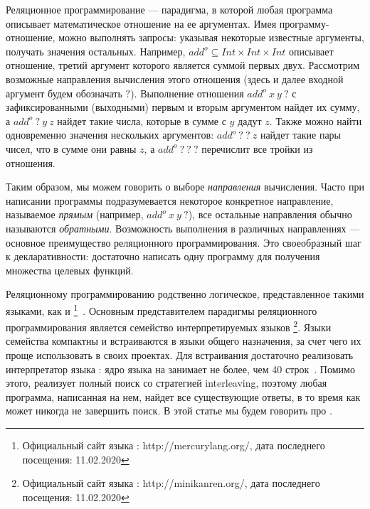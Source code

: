 \documentclass[conference,american,russian]{IEEEtran}
\begin{document}
Реляционное программирование --- парадигма, в которой любая программа описывает математическое отношение на ее аргументах. 
Имея программу-отношение, можно выполнять запросы: указывая некоторые известные аргументы, получать значения остальных.
Например, $add^o \subseteq Int \times Int \times Int$ описывает отношение, третий аргумент которого является суммой первых двух. 
Рассмотрим возможные направления вычисления этого отношения (здесь и далее входной аргумент будем обозначать $?$).
Выполнение отношения $add^o  \ x \ y \ ?$ с зафиксированными (выходными) первым и вторым аргументом найдет их сумму, а $add^o \ ? \ y \ z$ найдет такие числа, которые в сумме с $y$ дадут $z$. 
Также можно найти одновременно значения нескольких аргументов: $add^o \ ? \ ? \ z$ найдет такие пары чисел, что в сумме они равны $z$, а $add^o \ ? \ ? \ ?$ перечислит все тройки из отношения. 

Таким образом, мы можем говорить о выборе \textit{направления} вычисления. 
Часто при написании программы подразумевается некоторое конкретное направление, называемое \textit{прямым} (например, $add^o  \ x \ y \ ?$), все остальные направления обычно называются \textit{обратными}. 
Возможность выполнения в различных направлениях --- основное преимущество реляционного программирования. 
Это своеобразный шаг к декларативности: достаточно написать одну программу для получения множества целевых функций. 

Реляционному программированию родственно логическое, представленное такими языками, как \prolog{} и \mercury{}\footnote{Официальный сайт языка \mercury{}: http://mercurylang.org/, дата последнего посещения: 11.02.2020}~\cite{SOMOGYI199617}.
Основным представителем парадигмы реляционного программирования является семейство интерпретируемых языков \miniKanren{}\footnote{Официальный сайт языка \miniKanren{}: http://minikanren.org/, дата последнего посещения: 11.02.2020}.
Языки семейства \miniKanren{} компактны и встраиваются в языки общего назначения, за счет чего их проще использовать в своих проектах. 
Для встраивания достаточно реализовать интерпретатор языка \miniKanren{}: ядро языка на \scheme{} занимает не более, чем 40 строк~\cite{hemann2013ukanren}.
Помимо этого, \miniKanren{} реализует полный поиск со стратегией interleaving, поэтому любая программа, написанная на нем, найдет все существующие ответы, в то время как \prolog{} может никогда не завершить поиск. 
В этой статье мы будем говорить про \miniKanren{}.
\end{document}
